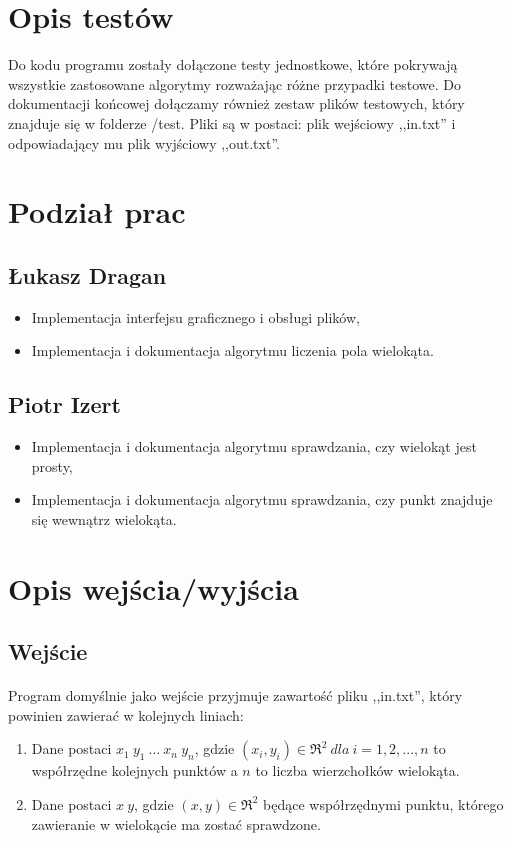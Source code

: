 \documentclass{article}
\begin{document}
\section{Opis testów}
Do kodu programu zostały dołączone testy jednostkowe, które pokrywają wszystkie zastosowane algorytmy rozważając różne przypadki testowe. Do dokumentacji końcowej dołączamy również zestaw plików testowych, który znajduje się w folderze /test. Pliki są w postaci: plik wejściowy ,,in.txt'' i odpowiadający mu plik wyjściowy ,,out.txt''.


\section{Podział prac}
\subsection{Łukasz Dragan}
\begin{itemize}
\item Implementacja interfejsu graficznego i obsługi plików,
\item Implementacja i dokumentacja algorytmu liczenia pola wielokąta.
\end{itemize}

\subsection{Piotr Izert}
\begin{itemize}
\item Implementacja i dokumentacja algorytmu sprawdzania, czy wielokąt jest prosty,
\item Implementacja i dokumentacja algorytmu sprawdzania, czy punkt znajduje się wewnątrz wielokąta.
\end{itemize}









\section{Opis wejścia/wyjścia}

\subsection{Wejście}

\paragraph{}
Program domyślnie jako wejście przyjmuje zawartość pliku ,,in.txt'', który powinien zawierać w kolejnych liniach:
\begin{enumerate}
\item Dane postaci \(x_1\ y_1\ ...\ x_n\ y_n\), gdzie \((x_i,y_i) \in \Re^{2} \ dla\ i=1,2,...,n\) to współrzędne kolejnych punktów a \(n\) to liczba wierzchołków wielokąta.
\item Dane postaci \(x\ y\), gdzie \((x,y) \in \Re^{2}\) będące współrzędnymi punktu, którego zawieranie w wielokącie ma zostać sprawdzone.
\end{enumerate}
\end{document}
